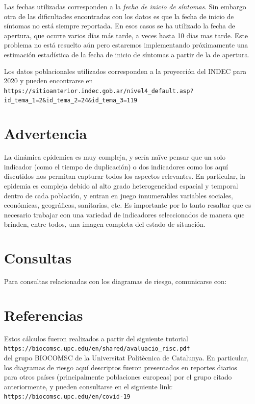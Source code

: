 \documentclass[12pt,a4paper]{article}
\begin{document}
Las fechas utilizadas corresponden a la \textit{fecha de inicio de síntomas}. Sin embargo otra de las dificultades encontradas con los datos es que la fecha de inicio de síntomas no está siempre reportada. En esos casos se ha utilizado la fecha de apertura, que ocurre varios días más tarde, a veces hasta 10 días mas tarde. Este problema no est\'a resuelto a\'un pero estaremos implementando pr\'oximamente una estimación estadística de la fecha de inicio de síntomas a partir de la de apertura.

Los datos poblacionales utilizados corresponden a la proyección del INDEC para 2020 y pueden encontrarse en \\

\verb|https://sitioanterior.indec.gob.ar/nivel4_default.asp?|\\
\verb|id_tema_1=2&id_tema_2=24&id_tema_3=119|

\section*{Advertencia}
La dinámica epídemica es muy compleja, y sería na\"{i}ve pensar que un solo indicador 
(como el tiempo de duplicación) o dos indicadores como los aquí discutidos nos permitan capturar todos los aspectos relevantes. En particular, la epidemia es compleja debido al alto grado heterogeneidad espacial y temporal dentro de cada población, y entran en juego 
innumerables variables sociales, económicas, geográficas, sanitarias, etc.
Es importante por lo tanto resaltar que es necesario trabajar con una variedad de indicadores seleccionados de manera que brinden, entre todos, una imagen completa del estado de situación. 


\section*{Consultas}
Para consultas relacionadas con los diagramas de riesgo, comunicarse con:\\

\noindent{}

\section*{Referencias}
Estos cálculos fueron realizados a partir del siguiente 
tutorial\\

\verb|https://biocomsc.upc.edu/en/shared/avaluacio_risc.pdf|\\

del grupo BIOCOMSC de la Universitat Politècnica de Catalunya. 
En particular, los diagramas de riesgo aquí descriptos fueron presentados
en reportes diarios para otros países (principalmente poblaciones europeas) 
por el grupo citado anteriormente, y pueden consultarse en el siguiente link:\\

\verb|https://biocomsc.upc.edu/en/covid-19|
\end{document}
